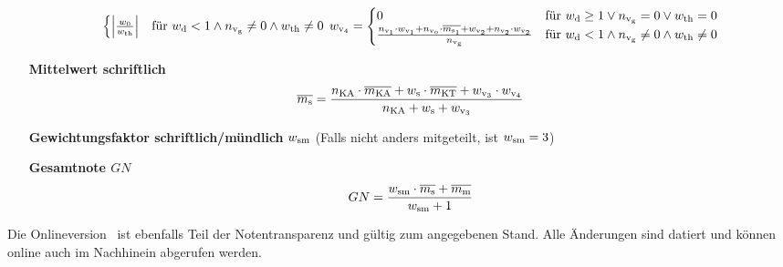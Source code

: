 \begin{enumerate}[label=\textbf{\textbullet}, align=left, leftmargin=*]
\[\begin{cases}
		\left | \frac{w_{0}}{w_{\mathrm{th}}}  \right | & \text{für } w_{\mathrm{d}} < 1 \land n_{\mathrm{v}_\mathrm{g}} \neq 0 \land  w_{\mathrm{th}} \neq 0\\
	\end{cases}
	\,
	w_{\mathrm{v}_4} =
	\begin{cases}
		0 & \text{für }  w_{\mathrm{d}} \geq 1 \lor n_{\mathrm{v}_\mathrm{g}}=0 \lor w_{\mathrm{th}} = 0\\
		\frac{n_{\mathrm{v}_1} \cdot w_{\mathrm{v}_1} + n_{\mathrm{v}_\mathrm{o}} \cdot \overline{m_{\mathrm{s}_1}} + w_{\mathrm{v}_2} + n_{\mathrm{v}_2} \cdot w_{\mathrm{v}_2}}{n_{\mathrm{v}_\mathrm{g}}} & \text{für }    w_{\mathrm{d}} < 1 \land n_{\mathrm{v}_\mathrm{g}} \neq 0 \land  w_{\mathrm{th}} \neq 0\\
	\end{cases}
	\]	
	\item[\textbf{Mittelwert schriftlich}]
	\vspace{-0.3cm}
	\[
	\overline{m_{\mathrm{s}}} = \frac{ n_{\mathrm{KA}} \cdot \overline{m_{\mathrm{KA}}} + w_{\mathrm{s}} \cdot \overline{m_{\mathrm{KT}}} +w_{\mathrm{v}_3} \cdot w_{\mathrm{v}_4}   }{n_{\mathrm{KA}} + w_{\mathrm{s}} + w_{\mathrm{v}_3}}
	\]
	\item[\textbf{Gewichtungsfaktor schriftlich/mündlich}] $w_{\mathrm{sm}}$ (Falls nicht anders mitgeteilt, ist $w_{\mathrm{sm}}=3$)
	\item[\textbf{Gesamtnote $GN$}]
	\[
	GN = \frac{w_{\mathrm{sm}} \cdot \overline{m_{\mathrm{s}}} + \overline{m_{\mathrm{m}}}}{w_{\mathrm{sm}}+1}
	\]
\end{enumerate}

\renewcommand\refname{\footnotesize Mathematische Notationen}
\renewcommand{\bibname}{Quellen}

\vfill


\begingroup
\tiny
\setlength{\bibsep}{0pt}


\endgroup

{\tiny Die Onlineversion \onlinedoc \, ist ebenfalls Teil der Notentransparenz und gültig zum angegebenen Stand. Alle Änderungen sind datiert und können online auch im Nachhinein abgerufen werden.}